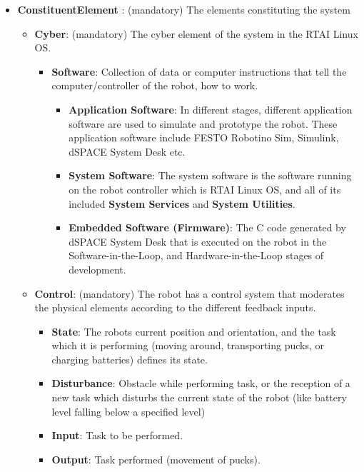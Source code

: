 \begin{itemize}
    \item \checkmark \textbf{ConstituentElement} : (mandatory) The elements constituting the system
    \begin{itemize}
        \item \checkmark \textbf{Cyber}: (mandatory) The cyber element of the system in the RTAI Linux OS.
        \begin{itemize}
            \item \checkmark \textbf{Software}: Collection of data or computer instructions that tell the computer/controller of the robot, how to work. 
            \begin{itemize}
                \item \checkmark \textbf{Application Software}: In different stages, different application software are used to simulate and prototype the robot. These application software include FESTO Robotino Sim, Simulink, dSPACE System Desk etc.
                \item \checkmark \textbf{System Software}: The system software is the software running on the robot controller which is RTAI Linux OS, and all of its included \textbf{System Services} and \textbf{System Utilities}.
                \item \checkmark \textbf{Embedded Software (Firmware)}: The C code generated by dSPACE System Desk that is executed on the robot in the Software-in-the-Loop, and Hardware-in-the-Loop stages of development.
            \end{itemize}
        \end{itemize}
        \item \checkmark \textbf{Control}: (mandatory) The robot has a control system that moderates the physical elements according to the different feedback inputs.
        \begin{itemize}
            \item \checkmark \textbf{State}: The robots current position and orientation, and the task which it is performing (moving around, transporting pucks, or charging batteries) defines its state.
            \item \checkmark \textbf{Disturbance}: Obstacle while performing task, or the reception of a new task which disturbs the current state of the robot (like battery level falling below a specified level)
            \item \checkmark \textbf{Input}: Task to be performed.
            \item \checkmark \textbf{Output}: Task performed (movement of pucks).

\end{itemize}
\end{itemize}
\end{itemize}
